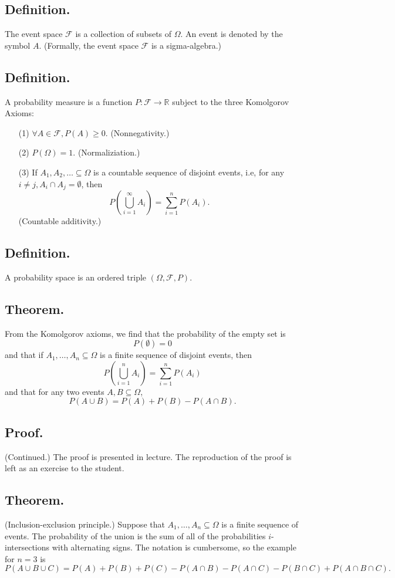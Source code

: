 \documentclass[titlepage]{article}
\begin{document}
\subsection{Definition.} The event space $\mathcal{F}$ is a collection of subsets of $\Omega$. An event is denoted by the symbol $A$. (Formally, the event space $\mathcal{F}$ is a sigma-algebra.)

\subsection{Definition.} A probability measure is a function $P: \mathcal{F} \to \mathbb{R}$ subject to the three Komolgorov Axioms:
\begin{enumerate}
\item[(1)] $\forall A \in \mathcal{F}, P(A) \geq 0.$ (Nonnegativity.)
\item[(2)] $P(\Omega) = 1.$ (Normaliziation.)
\item[(3)] If $A_{1}, A_{2}, \ldots \subseteq \Omega$ is a countable sequence of disjoint events, i.e, for any $i \neq j, A_{i} \cap A_{j} = \emptyset$, then 
$$P\left(\bigcup_{i=1}^{\infty}A_{i}\right) = \sum_{i=1}^{n}P(A_{i}).$$
(Countable additivity.)
\end{enumerate}

\subsection{Definition.} A probability space is an ordered triple $(\Omega, \mathcal{F}, P)$.

\subsection{Theorem.} From the Komolgorov axioms, we find 
that the probability of the empty set is 
$$P(\emptyset) = 0$$
and that if $A_{1}, \ldots, A_{n} \subseteq \Omega$ is a finite sequence of disjoint events, then 
$$P\left(\bigcup_{i=1}^{n}A_{i}\right) = \sum_{i=1}^{n}P(A_{i})$$
and that for any two events $A, B \subseteq \Omega$, 
$$P(A \cup B) = P(A) + P(B) - P(A \cap B).$$

\subsection{Proof.} (Continued.) The proof is presented in lecture. The reproduction of the proof is left as an exercise to the student.

\subsection{Theorem.} (Inclusion-exclusion principle.) Suppose that $A_{1}, \ldots, A_{n} \subseteq \Omega$ is a finite sequence of events. The probability of the union is the sum of all of the probabilities $i$-intersections with alternating signs. The notation is cumbersome, so the example for $n = 3$ is 
$$P(A \cup B \cup C) = P(A) + P(B) + P(C) - P(A \cap B) - P(A \cap C) - P(B \cap C) + P(A \cap B \cap C).$$
\end{document}
